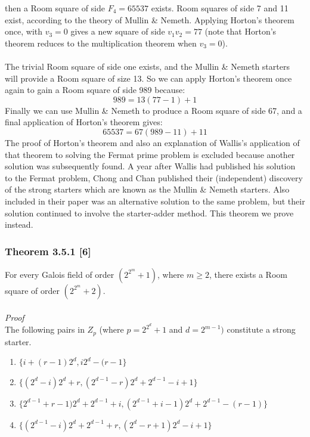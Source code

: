 \documentclass[
  12pt,
  a4paper]{book}
\begin{document}
then a Room square of side \(F_4=65537\) exists. Room squares of side 7
and 11 exist, according to the theory of Mullin \& Nemeth. Applying
Horton's theorem once, with \(v_3=0\) gives a new square of side
\(v_1v_2=77\) (note that Horton's theorem reduces to the multiplication
theorem when \(v_3=0\)).\\
~\\
The trivial Room square of side one exists, and the Mullin \& Nemeth
starters will provide a Room square of size 13. So we can apply Horton's
theorem once again to gain a Room square of side 989 because:
\[989=13(77-1)+1\] Finally we can use Mullin \& Nemeth to produce a Room
square of side 67, and a final application of Horton's theorem gives:
\[65537=67(989-11)+11\] The proof of Horton's theorem and also an
explanation of Wallis's application of that theorem to solving the
Fermat prime problem is excluded because another solution was
subsequently found. A year after Wallis had published his solution to
the Fermat problem, Chong and Chan published their (independent)
discovery of the strong starters which are known as the Mullin \& Nemeth
starters. Also included in their paper was an alternative solution to
the same problem, but their solution continued to involve the
starter-adder method. This theorem we prove instead.

\hypertarget{theorem-3.5.1-6}{%
\subsubsection{Theorem 3.5.1 {[}6{]}}\label{theorem-3.5.1-6}}

For every Galois field of order \((2^{2^m}+1)\), where \(m \geq 2\),
there exists a Room square of order \((2^{2^m}+2)\).\\
~\\
\emph{Proof}\\
The following pairs in \(Z_p\) (where \(p=2^{2^d}+1\) and \(d=2^{m-1})\)
constitute a strong starter.

\begin{enumerate}
\def\labelenumi{\arabic{enumi}.}
\item
  \(\{i+(r-1)2^d,i2^d-(r-1\}\)
\item
  \(\{(2^d-i)2^d+r,(2^{d-1}-r)2^d+2^{d-1}-i+1\}\)
\item
  \(\{2^{d-1}+r-1)2^d+2^{d-1}+i,(2^{d-1}+i-1)2^d+2^{d-1}-(r-1)\}\)
\item
  \(\{(2^{d-1}-i)2^d+2^{d-1}+r,(2^d-r+1)2^d-i+1\}\)
\end{enumerate}
\end{document}

